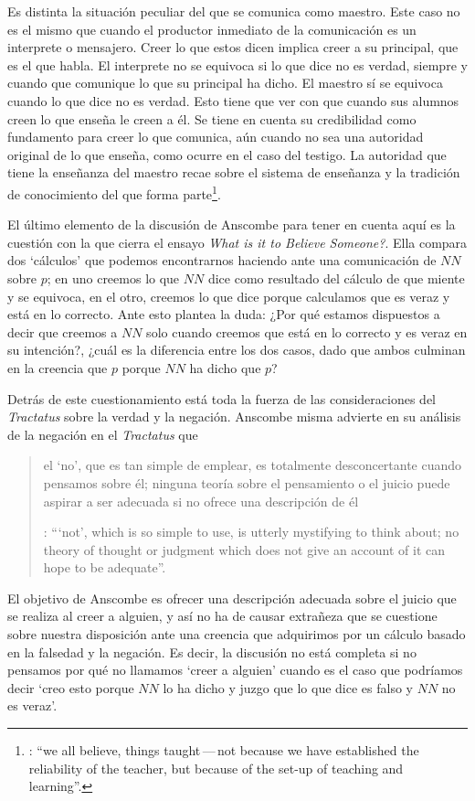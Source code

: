Es distinta la situación peculiar del que se comunica como maestro. Este caso no es el mismo que cuando el productor inmediato de la comunicación es un interprete o mensajero. Creer lo que estos dicen implica creer a su principal, que es el que habla. El interprete no se equivoca si lo que dice no es verdad, siempre y cuando que comunique lo que su principal ha dicho. El maestro sí se equivoca cuando lo que dice no es verdad. Esto tiene que ver con que cuando sus alumnos creen lo que enseña le creen a él. Se tiene en cuenta su credibilidad como fundamento para creer lo que comunica, aún cuando no sea una autoridad original de lo que enseña, como ocurre en el caso del testigo. La autoridad que tiene la enseñanza del maestro recae sobre el sistema de enseñanza y la tradición de conocimiento del que forma parte\footnote{\cite[Cf.][214]{teichmann2008ans}: \enquote{we all believe, things taught\,---\,not because we have established the reliability of the teacher, but because of the set-up of teaching and learning}.}.

El último elemento de la discusión de Anscombe para tener en cuenta aquí es la cuestión con la que cierra el ensayo \emph{What is it to Believe Someone?}. Ella compara dos `cálculos' que podemos encontrarnos haciendo ante una comunicación de $NN$ sobre $p$; en uno creemos lo que $NN$ dice como resultado del cálculo de que miente y se equivoca, en el otro, creemos lo que dice porque calculamos que es veraz y está en lo correcto. Ante esto plantea la duda: ¿Por qué estamos dispuestos a decir que creemos a $NN$ solo cuando creemos que está en lo correcto y es veraz en su intención?, ¿cuál es la diferencia entre los dos casos, dado que ambos culminan en la creencia que $p$ porque $NN$ ha dicho que $p$?
\label{subsec:verdad}

Detrás de este cuestionamiento está toda la fuerza de las consideraciones del \emph{Tractatus} sobre la verdad y la negación. Anscombe misma advierte en su análisis de la negación en el \emph{Tractatus} que \blockquote[{\Cite[19]{anscombe1959iwt}}: \enquote{`not', which is so simple to use, is utterly mystifying to think about; no theory of thought or judgment which does not give an account of it can hope to be adequate}.]{el `no', que es tan simple de emplear, es totalmente desconcertante cuando pensamos sobre él; ninguna teoría sobre el pensamiento o el juicio puede aspirar a ser adecuada si no ofrece una descripción de él}. El objetivo de Anscombe es ofrecer una descripción adecuada sobre el juicio que se realiza al creer a alguien, y así no ha de causar extrañeza que se cuestione sobre nuestra disposición ante una creencia que adquirimos por un cálculo basado en la falsedad y la negación. Es decir, la discusión no está completa si no pensamos por qué no llamamos `creer a alguien' cuando es el caso que podríamos decir \enquote*{creo esto porque $NN$ lo ha dicho y juzgo que lo que dice es falso y $NN$ no es veraz}.


